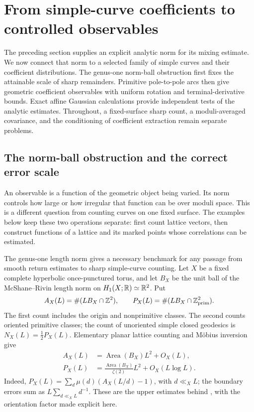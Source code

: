 \section{From simple-curve coefficients to controlled observables}
\label{sec:coefficientobservables}

The preceding section supplies an explicit analytic norm for its mixing
estimate. We now connect that norm to a selected family of simple curves
and their coefficient distributions. The genus-one norm-ball obstruction
first fixes the attainable scale of sharp remainders. Primitive
pole-to-pole arcs then give geometric coefficient observables with
uniform rotation and terminal-derivative bounds. Exact affine Gaussian
calculations provide independent tests of the analytic estimates.
Throughout, a fixed-surface sharp count, a moduli-averaged covariance,
and the conditioning of coefficient extraction remain separate problems.

\subsection{The norm-ball obstruction and the correct error scale}
\label{subsec:normballbarrier}

An observable is a function of the geometric object being varied.
Its norm controls how large or how irregular that function can be
over moduli space. This is a different question from counting curves
on one fixed surface. The examples below keep these two operations
separate: first count lattice vectors, then construct functions of a
lattice and its marked points whose correlations can be estimated.

The genus-one length norm gives a necessary benchmark for any passage from
smooth return estimates to sharp simple-curve counting. Let $X$ be a fixed
complete hyperbolic once-punctured torus, and let $B_X$ be the unit ball of
the McShane--Rivin length norm on $H_1(X;\mathbb R)\simeq\mathbb R^2$. Put
\[
 A_X(L)=\#(LB_X\cap\mathbb Z^2),\qquad
 P_X(L)=\#(LB_X\cap\mathbb Z^2_{\mathrm{prim}}).
\]
The first count includes the origin and nonprimitive classes. The second
counts oriented primitive classes; the count of unoriented simple closed
geodesics is $N_X(L)=\tfrac12P_X(L)$. Elementary planar lattice counting
and M\"obius inversion give
\begin{align}
 A_X(L)&=\operatorname{Area}(B_X)L^2+O_X(L),\label{eq:normballall}\\
 P_X(L)&=\frac{\operatorname{Area}(B_X)}{\zeta(2)}L^2
           +O_X(L\log L).\label{eq:normballprimitive}
\end{align}
Indeed, $P_X(L)=\sum_d\mu(d)(A_X(L/d)-1)$, with $d\ll_X L$;
the boundary errors sum as $L\sum_{d\ll_X L}d^{-1}$. These are the
upper estimates behind \cite[Theorem~4.1]{McShaneRivinTori}, with the
orientation factor made explicit here.

